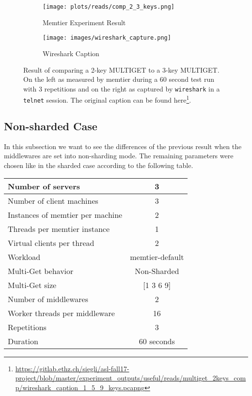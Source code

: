 \documentclass[11pt,a4paper]{article}
\let\tt\texttt
\begin{document}
\begin{figure}
\begin{subfigure}[b]{.3\textwidth}
    \centering
    \texttt{[image: plots/reads/comp\_2\_3\_keys.png]}
    \caption{Memtier Experiment Result}
    \label{plt:reads:comp_2_3_keys}
\end{subfigure}%
\begin{subfigure}[b]{.7\textwidth}
    \centering
    \texttt{[image: images/wireshark\_capture.png]}
    \caption{Wireshark Caption}
    \label{img:wires1hark_caption}
\end{subfigure}%
\caption[lof caption]{Result of comparing a 2-key MULTIGET to a 3-key MULTIGET. On the left as measured by memtier during a 60 second test run with 3 repetitions and on the right as captured by \tt{wireshark} in a \tt{telnet} session. The original caption can be found here\footnote{\url{https://gitlab.ethz.ch/siegli/asl-fall17-project/blob/master/experiment_outputs/useful/reads/multiget_2keys_comp/wireshark_caption_1_5_9_keys.pcapng}}.}
\label{img:reads:comp23}
\end{figure}


\newpage

\subsection{Non-sharded Case}\label{sub:non_sharded}

In this subsection we want to see the differences of the previous result when the middlewares are set into non-sharding mode. The remaining parameters were chosen like in the sharded case according to the following table.

\begin{center}
	\scriptsize{
		\begin{tabular}{|l|c|}
			\hline Number of servers                & 3                       \\ 
			\hline Number of client machines        & 3                       \\ 
			\hline Instances of memtier per machine & 2                       \\ 
			\hline Threads per memtier instance     & 1                       \\
			\hline Virtual clients per thread       & 2                		 \\ 
			\hline Workload                         & memtier-default             \\
			\hline Multi-Get behavior               & Non-Sharded             \\
			\hline Multi-Get size                   & [1 3 6 9]                  \\
			\hline Number of middlewares            & 2                       \\
			\hline Worker threads per middleware    & 16 \\
			\hline Repetitions                      & 3    \\
			\hline Duration                         & 60 seconds \\
			\hline 
		\end{tabular}
	} 
\end{center}
\end{document}
